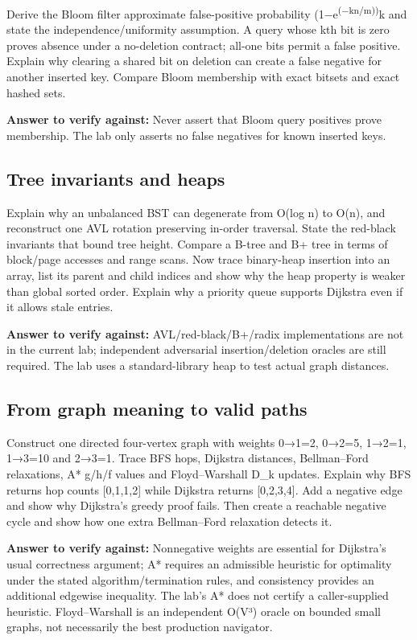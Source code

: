 Derive the Bloom filter approximate false-positive probability (1−e\textsuperscript{(−kn/m))}k and state the independence/uniformity assumption. A query whose kth bit is zero proves absence under a no-deletion contract; all-one bits permit a false positive. Explain why clearing a shared bit on deletion can create a false negative for another inserted key. Compare Bloom membership with exact bitsets and exact hashed sets.

\textbf{Answer to verify against:} Never assert that Bloom query positives prove membership. The lab only asserts no false negatives for known inserted keys.

\subsection{Tree invariants and heaps}\label{appendix-8a046b38375e-tree-invariants-and-heaps}

Explain why an unbalanced BST can degenerate from O(log n) to O(n), and reconstruct one AVL rotation preserving in-order traversal. State the red-black invariants that bound tree height. Compare a B-tree and B+ tree in terms of block/page accesses and range scans. Now trace binary-heap insertion into an array, list its parent and child indices and show why the heap property is weaker than global sorted order. Explain why a priority queue supports Dijkstra even if it allows stale entries.

\textbf{Answer to verify against:} AVL/red-black/B+/radix implementations are not in the current lab; independent adversarial insertion/deletion oracles are still required. The lab uses a standard-library heap to test actual graph distances.

\subsection{From graph meaning to valid paths}\label{appendix-8a046b38375e-from-graph-meaning-to-valid-paths}

Construct one directed four-vertex graph with weights 0→1=2, 0→2=5, 1→2=1, 1→3=10 and 2→3=1. Trace BFS hops, Dijkstra distances, Bellman--Ford relaxations, A* g/h/f values and Floyd--Warshall D\_k updates. Explain why BFS returns hop counts {[}0,1,1,2{]} while Dijkstra returns {[}0,2,3,4{]}. Add a negative edge and show why Dijkstra's greedy proof fails. Then create a reachable negative cycle and show how one extra Bellman--Ford relaxation detects it.

\textbf{Answer to verify against:} Nonnegative weights are essential for Dijkstra's usual correctness argument; A* requires an admissible heuristic for optimality under the stated algorithm/termination rules, and consistency provides an additional edgewise inequality. The lab's A* does not certify a caller-supplied heuristic. Floyd--Warshall is an independent O(V³) oracle on bounded small graphs, not necessarily the best production navigator.

